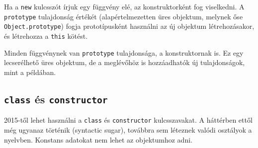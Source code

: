 \begin{frame}
    \begin{exampleblock}{}
        \small
        
    \end{exampleblock}
\end{frame}

\begin{frame}
    \small
    Ha a \texttt{new} kulcsszót írjuk egy függvény elé, az konstruktorként fog viselkedni. 
    A \texttt{prototype} tulajdonság értékét (alapértelmezetten üres objektum, melynek őse \texttt{Object.prototype}) 
    fogja prototípusként használni az új objektum létrehozásakor, és létrehozza a \texttt{this} kötést.
    \begin{exampleblock}{}
        \footnotesize
        
    \end{exampleblock}
\end{frame}

\begin{frame}
    \begin{exampleblock}{}
        \footnotesize
        
    \end{exampleblock}
    Minden függvénynek van \texttt{prototype} tulajdonsága, a konstruktornak is. Ez egy lecserélhető üres objektum, 
    de a meglévőhöz is hozzáadhatók új tulajdonságok, mint a példában. 
\end{frame}

\subsection{\texttt{class} és \texttt{constructor}}

\begin{frame}
    2015-től lehet használni a \texttt{class} és \texttt{constructor} kulcsszavakat. A háttérben ettől még 
    ugyanaz történik (syntactic sugar), továbbra sem léteznek valódi osztályok a nyelvben. Konstans adatokat nem lehet 
    az objektumhoz adni.
    \begin{exampleblock}{}
        \footnotesize
        \vspace{-.2cm}
        
        \vspace{-.2cm}
    \end{exampleblock}
\end{frame}


